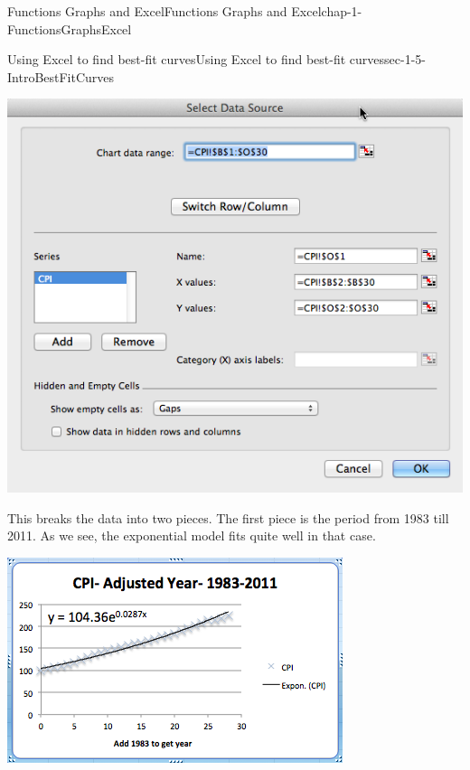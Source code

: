 \documentclass[oneside,10pt,]{book}
\numberwithin{equation}{section}
\begin{document}
\begin{chapterptx}{Functions Graphs and Excel}{}{Functions Graphs and Excel}{}{}{chap-1-FunctionsGraphsExcel}
\begin{sectionptx}{Using Excel to find best-fit curves}{}{Using Excel to find best-fit curves}{}{}{sec-1-5-IntroBestFitCurves}
\begin{sidebyside}{1}{0.1}{0.1}{0}
\begin{sbspanel}{0.8}
\includegraphics[width=1\linewidth]{images/sec1-5-14.png}
\end{sbspanel}%
\end{sidebyside}%
%
\par
\hypertarget{p-402}{}%
This breaks the data into two pieces.  The first piece is the period from 1983 till 2011.  As we see, the exponential model fits quite well in that case. \leavevmode%
\begin{sidebyside}{1}{0.1}{0.1}{0}%
\begin{sbspanel}{0.8}%
\includegraphics[width=1\linewidth]{images/sec1-5-15.png}
\end{sbspanel}%
\end{sidebyside}%
%
\par

\end{sectionptx}
\end{chapterptx}
\end{document}
